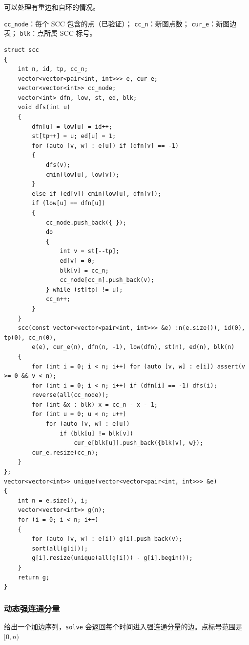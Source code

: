 \documentclass[12pt]{ctexart}
\begin{document}
可以处理有重边和自环的情况。

\verb|cc_node|：每个 SCC 包含的点（已验证）；
\verb|cc_n|：新图点数；
\verb|cur_e|：新图边表；
\verb|blk|：点所属 SCC 标号。

\begin{lstlisting}
struct scc
{
	int n, id, tp, cc_n;
	vector<vector<pair<int, int>>> e, cur_e;
	vector<vector<int>> cc_node;
	vector<int> dfn, low, st, ed, blk;
	void dfs(int u)
	{
		dfn[u] = low[u] = id++;
		st[tp++] = u; ed[u] = 1;
		for (auto [v, w] : e[u]) if (dfn[v] == -1)
		{
			dfs(v);
			cmin(low[u], low[v]);
		}
		else if (ed[v]) cmin(low[u], dfn[v]);
		if (low[u] == dfn[u])
		{
			cc_node.push_back({ });
			do
			{
				int v = st[--tp];
				ed[v] = 0;
				blk[v] = cc_n;
				cc_node[cc_n].push_back(v);
			} while (st[tp] != u);
			cc_n++;
		}
	}
	scc(const vector<vector<pair<int, int>>> &e) :n(e.size()), id(0), tp(0), cc_n(0),
		e(e), cur_e(n), dfn(n, -1), low(dfn), st(n), ed(n), blk(n)
	{
		for (int i = 0; i < n; i++) for (auto [v, w] : e[i]) assert(v >= 0 && v < n);
		for (int i = 0; i < n; i++) if (dfn[i] == -1) dfs(i);
		reverse(all(cc_node));
		for (int &x : blk) x = cc_n - x - 1;
		for (int u = 0; u < n; u++)
			for (auto [v, w] : e[u])
				if (blk[u] != blk[v])
					cur_e[blk[u]].push_back({blk[v], w});
        cur_e.resize(cc_n);
	}
};
vector<vector<int>> unique(vector<vector<pair<int, int>>> &e)
{
    int n = e.size(), i;
    vector<vector<int>> g(n);
    for (i = 0; i < n; i++)
    {
        for (auto [v, w] : e[i]) g[i].push_back(v);
        sort(all(g[i]));
        g[i].resize(unique(all(g[i])) - g[i].begin());
    }
    return g;
}

\end{lstlisting}

\subsubsection{动态强连通分量}

给出一个加边序列，\verb|solve| 会返回每个时间进入强连通分量的边。点标号范围是 $[0,n)$
\end{document}
